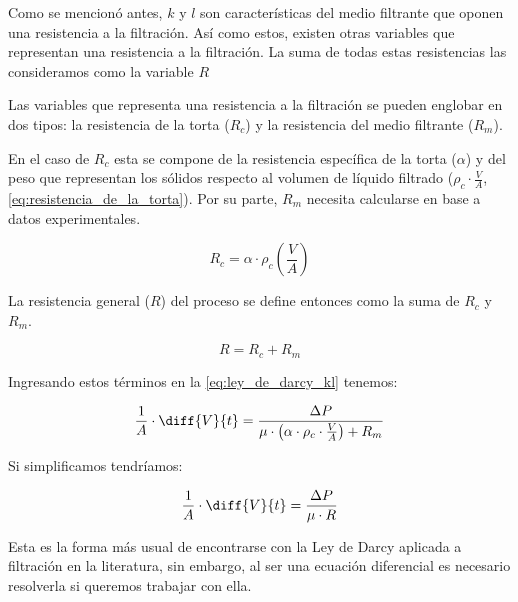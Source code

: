 Como se mencionó antes, $k$ y $l$ son características del medio filtrante que oponen una resistencia a la filtración. Así como estos, existen otras variables que representan una resistencia a la filtración. La suma de todas estas resistencias las consideramos como la variable $R$

Las variables que representa una resistencia a la filtración se pueden englobar en dos tipos: la resistencia de la torta ($R_{c}$) y la resistencia del medio filtrante ($R_{m}$).

En el caso de $R_{c}$ esta se compone de la resistencia específica de la torta ($\alpha$) y del peso que representan los sólidos respecto al volumen de líquido filtrado ($\rho_{c}\cdot\frac{V}{A}$, \autoref{eq:resistencia_de_la_torta}). Por su parte, $R_{m}$ necesita calcularse en base a datos experimentales.

\begin{equation}\label{eq:resistencia_de_la_torta}
    R_{c} = \alpha \cdot \rho_{c} \left(\frac{V}{A}\right)
\end{equation}

La resistencia general ($R$) del proceso se define entonces como la suma de $R_{c}$ y $R_{m}$.

\begin{equation}\label{eq:resistencias}
    R = R_{c} + R_{m}
\end{equation}

Ingresando estos términos en la \autoref{eq:ley_de_darcy_kl} tenemos:

\begin{equation*}
    \frac{1}{A} \cdot \diff{V}{t} = \frac{\Delta P}{\mu \cdot \left(\alpha\cdot\rho_{c}\cdot\frac{V}{A}\right) + R_{m}}
\end{equation*}

Si simplificamos tendríamos:

\begin{equation}\label{eq:ley_de_darcy_R}
    \frac{1}{A} \cdot \diff{V}{t} = \frac{\Delta P}{\mu \cdot R}
\end{equation}

Esta es la forma más usual de encontrarse con la Ley de Darcy aplicada a filtración en la literatura, sin embargo, al ser una ecuación diferencial es necesario resolverla si queremos trabajar con ella.

